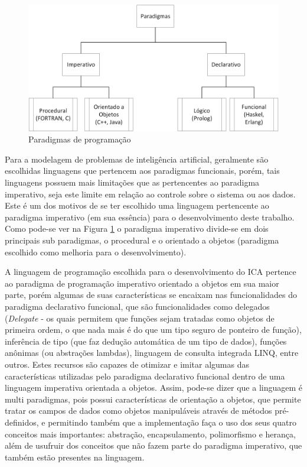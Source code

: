\begin{figure}[h]
	\centering	
	\includegraphics[scale=0.7]{Figuras/Ilustrations-Paradigms.png}
	\caption{Paradigmas de programação}
	\label{fig:Ilustrations-Paradigms}
	\end{figure}


Para a modelagem de problemas de inteligência artificial, geralmente são escolhidas linguagens que pertencem aos paradigmas funcionais, porém, tais linguagens possuem mais limitações que as pertencentes ao paradigma imperativo, seja este limite em relação ao controle sobre o sistema ou aos dados. Este é um dos motivos de se ter escolhido uma linguagem pertencente ao paradigma imperativo (em sua essência) para o desenvolvimento deste trabalho. Como pode-se ver na Figura \ref{fig:Ilustrations-Paradigms} o paradigma imperativo divide-se em dois principais sub paradigmas, o procedural e o orientado a objetos (paradigma escolhido como melhoria para o desenvolvimento). 

A linguagem de programação escolhida para o desenvolvimento do ICA pertence ao paradigma de programação imperativo orientado a objetos em sua maior parte, porém algumas de suas características se encaixam nas funcionalidades do paradigma declarativo funcional, que são funcionalidades como delegados (\emph{Delegate} - os quais permitem que funções sejam tratadas como objetos de primeira ordem, o que nada mais é do que um tipo seguro de ponteiro de função), inferência de tipo (que faz dedução automática de um tipo de dados), funções anônimas (ou abstrações lambdas), linguagem de consulta integrada LINQ, entre outros. Estes recursos são capazes de otimizar e imitar algumas das características utilizadas pelo paradigma declarativo funcional dentro de uma linguagem imperativa orientada a objetos. Assim, pode-se dizer que a linguagem é multi paradigmas, pois possui características de orientação a objetos, que permite tratar os campos de dados como objetos manipuláveis através de métodos pré-definidos, e permitindo também que a implementação faça o uso dos seus quatro conceitos mais importantes: abstração, encapsulamento, polimorfismo e herança, além de usufruir dos conceitos que não fazem parte do paradigma imperativo, que também estão presentes na linguagem. 

